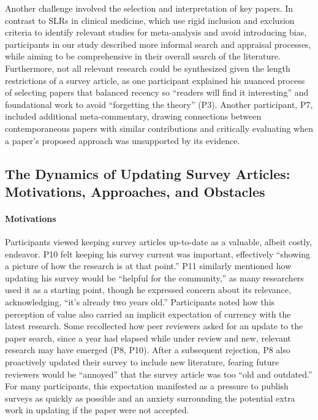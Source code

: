 Another challenge involved the selection and interpretation of key papers. In contrast to SLRs in clinical medicine, which use rigid inclusion and exclusion criteria to identify relevant studies for meta-analysis and avoid introducing bias, participants in our study described more informal search and appraisal processes, while aiming to be comprehensive in their overall search of the literature. Furthermore, not all relevant research could be synthesized given the length restrictions of a survey article, as one participant explained his nuanced process of selecting papers that balanced recency so ``readers will find it interesting'' and foundational work to avoid ``forgetting the theory'' (P3). Another participant, P7, included additional meta-commentary, drawing connections between contemporaneous papers with similar contributions and critically evaluating when a paper's proposed approach was unsupported by its evidence.


\subsection{The Dynamics of Updating Survey Articles: Motivations, Approaches, and Obstacles}

\paragraph{\textbf{Motivations}}
Participants viewed keeping survey articles up-to-date as a valuable, albeit costly, endeavor. P10 felt keeping his survey current was important, effectively ``showing a picture of how the research is at that point.'' P11 similarly mentioned how updating his survey would be ``helpful for the community,'' as many researchers used it as a starting point, though he expressed concern about its relevance, acknowledging, ``it's already two years old.'' Participants noted how this perception of value also carried an implicit expectation of currency with the latest research. Some recollected how peer reviewers asked for an update to the paper search, since a year had elapsed while under review and new, relevant research may have emerged (P8, P10). After a subsequent rejection, P8 also proactively updated their survey to include new literature, fearing future reviewers would be ``annoyed'' that the survey article was too ``old and outdated.'' For many participants, this expectation manifested as a pressure to publish surveys as quickly as possible and an anxiety surrounding the potential extra work in updating if the paper were not accepted.

